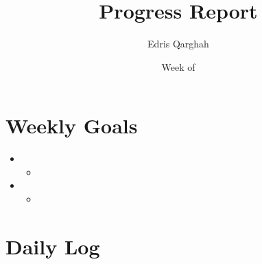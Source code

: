 \documentclass{weeklyreport}
\title{Progress Report}
\author{Edris Qarghah}
\date{Week of \DTMusedate{reportdate}}
\begin{document}
\maketitle

\newpage

\section*{Weekly Goals}


\begin{itemize}
	\item 
	\begin{itemize}
		\item 
	\end{itemize}
	\item 
	\begin{itemize}
		\item 
	\end{itemize}
\end{itemize}

\section*{Daily Log}

\subsection*{}
\end{document}
